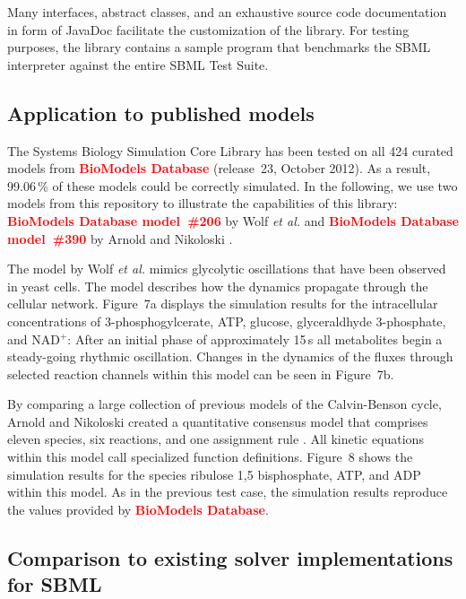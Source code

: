 \documentclass[10pt]{bmc_article}
\newenvironment{bmcformat}{\baselineskip20pt\sloppy\setboolean{publ}{false}}{\baselineskip20pt\sloppy}
\newcommand{\TODO}[1]{\textcolor{red}{\textbf{#1}}}
\begin{document}
\begin{bmcformat}
Many interfaces, abstract classes, and an exhaustive source code documentation
in form of JavaDoc facilitate the customization of the library.
For testing purposes, the library contains a sample program that benchmarks the
SBML interpreter against the entire SBML Test Suite.


\subsection*{Application to published models}

The Systems Biology Simulation Core Library has been tested on all 424 curated
models from \TODO{BioModels Database} \cite{Novere2006a} (release~23, October 2012).
As a result, 99.06\,\% of these models could be correctly simulated.
In the following, we use two models from this repository to illustrate the
capabilities of this library:
\TODO{BioModels Database model~\#206} by Wolf \emph{et al.} \cite{Wolf2000} and \TODO{BioModels Database model~\#390} by Arnold 
and Nikoloski \cite{Arnold2011}.

The model by Wolf \emph{et al.} \cite{Wolf2000} mimics glycolytic oscillations
that have been observed in yeast cells.
The model describes how the dynamics propagate through the cellular network.
Figure~7a displays the simulation results for the intracellular concentrations
of 3-phosphogylcerate, ATP, glucose, glyceraldhyde 3-phosphate, and NAD$^+$:
After an initial phase of approximately 15\,s all metabolites begin a
steady-going rhythmic oscillation.
Changes in the dynamics of the fluxes through selected reaction channels within
this model can be seen in Figure~7b. 

By comparing a large collection of previous models of the Calvin-Benson
cycle, Arnold and Nikoloski created a quantitative consensus model that
comprises eleven species, six reactions, and one assignment rule
\cite{Arnold2011}.
All kinetic equations within this model call specialized function definitions.
Figure~8 shows the simulation results for the species ribulose 1,5 bisphosphate,
ATP,  and ADP within this model.
As in the previous test case, the simulation results reproduce the values
provided by \TODO{BioModels Database}.  

\subsection*{Comparison to existing solver implementations for SBML}


\end{bmcformat}
\end{document}
